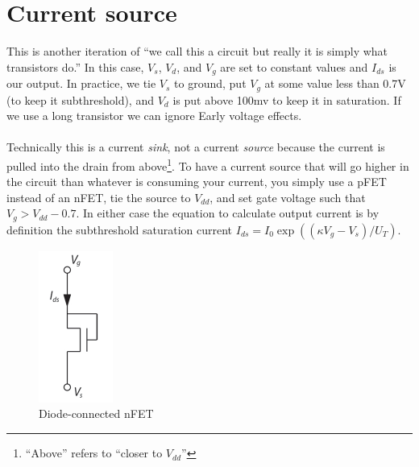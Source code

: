 \documentclass[main]{subfiles}
\begin{document}

\section{Current source}
This is another iteration of ``we call this a circuit but really it is simply what transistors do.'' In this case, $V_s$, $V_d$, and $V_g$ are set to constant values and $I_{ds}$ is our output. In practice, we tie $V_s$ to ground, put $V_g$ at some value less than 0.7V (to keep it subthreshold), and $V_d$ is put above 100mv to keep it in saturation. If we use a long transistor we can ignore Early voltage effects.\\ \\
Technically this is a current \emph{sink}, not a current \emph{source} because the current is pulled into the drain from above\footnote{``Above'' refers to ``closer to $V_{dd}$''}. To have a current source that will go higher in the circuit than whatever is consuming your current, you simply use a pFET instead of an nFET, tie the source to $V_{dd}$, and set gate voltage such that $V_g > V_{dd} - 0.7$. In either case the equation to calculate output current is by definition the subthreshold saturation current $I_{ds} = I_0 \exp ( (\kappa V_g - V_s)/U_T )$.
\begin{figure}[ht]
 \centering
\includegraphics[natwidth=185,natheight=375]{figs/nme_diodeConn_transistor.pdf}
\caption{Diode-connected nFET \label{diodeConn}}
\end{figure}
\end{document}
